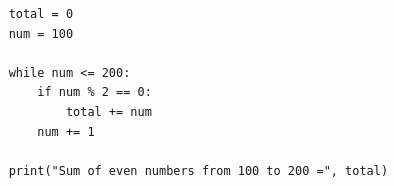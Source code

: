 \begin{verbatim}
    total = 0
    num = 100
    
    while num <= 200:
        if num % 2 == 0:
            total += num
        num += 1
    
    print("Sum of even numbers from 100 to 200 =", total)
\end{verbatim}